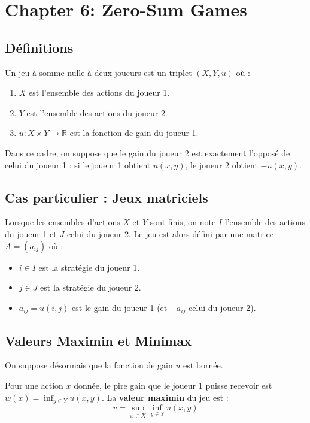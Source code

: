 
\section{Chapter 6: Zero-Sum Games}

\subsection{Définitions}

\begin{definition}
Un jeu à somme nulle à deux joueurs est un triplet $(X, Y, u)$ où :
\begin{enumerate}
    \item $X$ est l'ensemble des actions du joueur 1.
    \item $Y$ est l'ensemble des actions du joueur 2.
    \item $u: X \times Y \rightarrow \mathbb{R}$ est la fonction de gain du joueur 1.
\end{enumerate}
Dans ce cadre, on suppose que le gain du joueur 2 est exactement l'opposé de celui du joueur 1 : si le joueur 1 obtient $u(x, y)$, le joueur 2 obtient $-u(x, y)$.
\end{definition}

\subsection{Cas particulier : Jeux matriciels}
Lorsque les ensembles d'actions $X$ et $Y$ sont finis, on note $I$ l'ensemble des actions du joueur 1 et $J$ celui du joueur 2. Le jeu est alors défini par une matrice $A = (a_{ij})$ où :
\begin{itemize}
    \item $i \in I$ est la stratégie du joueur 1.
    \item $j \in J$ est la stratégie du joueur 2.
    \item $a_{ij} = u(i, j)$ est le gain du joueur 1 (et $-a_{ij}$ celui du joueur 2).
\end{itemize}

\subsection{Valeurs Maximin et Minimax}

On suppose désormais que la fonction de gain $u$ est bornée.

\begin{definition}
Pour une action $x$ donnée, le pire gain que le joueur 1 puisse recevoir est $w(x) = \inf_{y \in Y} u(x, y)$. La \textbf{valeur maximin} du jeu est :
$$\underline{v} = \sup_{x \in X} \inf_{y \in Y} u(x, y)$$
\end{definition}


